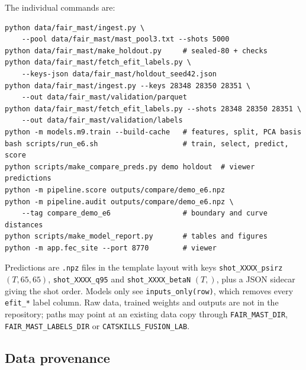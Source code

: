 \documentclass[11pt,a4paper]{article}
\numberwithin{equation}{section}
\begin{document}
The individual commands are:

\begin{verbatim}
python data/fair_mast/ingest.py \
    --pool data/fair_mast/mast_pool3.txt --shots 5000
python data/fair_mast/make_holdout.py     # sealed-80 + checks
python data/fair_mast/fetch_efit_labels.py \
    --keys-json data/fair_mast/holdout_seed42.json
python data/fair_mast/ingest.py --keys 28348 28350 28351 \
    --out data/fair_mast/validation/parquet
python data/fair_mast/fetch_efit_labels.py --shots 28348 28350 28351 \
    --out data/fair_mast/validation/labels
python -m models.m9.train --build-cache   # features, split, PCA basis
bash scripts/run_e6.sh                    # train, select, predict, score
python scripts/make_compare_preds.py demo holdout  # viewer predictions
python -m pipeline.score outputs/compare/demo_e6.npz
python -m pipeline.audit outputs/compare/demo_e6.npz \
    --tag compare_demo_e6                 # boundary and curve distances
python scripts/make_model_report.py       # tables and figures
python -m app.fec_site --port 8770        # viewer
\end{verbatim}

Predictions are \nolinkurl{.npz} files in the template layout with keys \texttt{shot\_XXXX\_psirz} \((T,65,65)\), \texttt{shot\_XXXX\_q95} and \texttt{shot\_XXXX\_betaN} \((T,)\), plus a JSON sidecar giving the shot order. Models only see \texttt{inputs\_only(row)}, which removes every \texttt{efit\_*} label column. Raw data, trained weights and outputs are not in the repository; paths may point at an existing data copy through \texttt{FAIR\_MAST\_DIR}, \texttt{FAIR\_MAST\_LABELS\_DIR} or \texttt{CATSKILLS\_FUSION\_LAB}.

\hypertarget{data-provenance}{%
\subsection{Data provenance}\label{data-provenance}}
\end{document}
